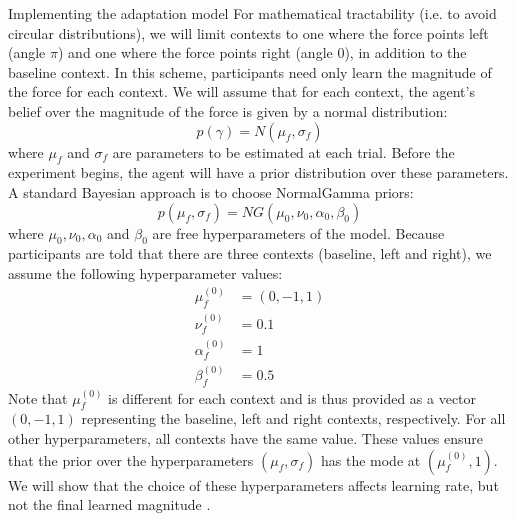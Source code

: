 \documentclass{report}
\begin{document}
\begin{chapter}{Implementing the adaptation model}
For mathematical tractability (i.e. to avoid circular distributions), we will
limit contexts to one where the force points left (angle $\pi$) and one where
the force points right (angle 0), in addition to the baseline context. In this
scheme, participants need only learn the magnitude of the force for each
context. We will assume that for each context, the agent's belief over the
magnitude of the force is given by a normal distribution:
\begin{equation}
p(\gamma) = N(\mu_f, \sigma_f) \label{eqn:data-dist}
\end{equation}
where $\mu_f$ and $\sigma_f$ are parameters to be estimated at each
trial. Before the experiment begins, the agent will have a prior distribution
over these parameters. A standard Bayesian approach is to choose NormalGamma
priors:
\begin{equation}
p(\mu_f, \sigma_f) = NG(\mu_0, \nu_0, \alpha_0, \beta_0)
\end{equation}
where $\mu_0, \nu_0, \alpha_0$ and $\beta_0$ are free hyperparameters of the
model. Because participants are told that there are three contexts (baseline,
left and right), we assume the following hyperparameter values:
\begin{align} \mu_f^{(0)} &= (0, -1, 1) \\
  \nu_f^{(0)} &= 0.1 \\
  \alpha_f^{(0)} &= 1 \\
  \beta_f^{(0)} &= 0.5
\end{align}
Note that $\mu_f^{(0)}$ is different for each context and is thus
provided as a vector $(0, -1, 1)$ representing the baseline, left and right
contexts, respectively. For all other hyperparameters, all contexts have the
same value. These values ensure that the prior over the hyperparameters
$(\mu_f, \sigma_f)$ has the mode at $(\mu_f^{(0)}, 1)$. We will show that the
choice of these hyperparameters affects learning rate, but not the final
learned magnitude .


\end{chapter}
\end{document}
